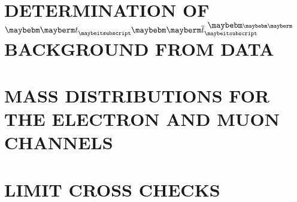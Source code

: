 \chapter{DETERMINATION OF $\ttbar$ BACKGROUND FROM DATA}
\label{sec:appttbar}




\chapter{MASS DISTRIBUTIONS FOR THE ELECTRON AND MUON CHANNELS}
\label{sec:emuratios}


\chapter{LIMIT CROSS CHECKS}
\label{sec:cutcount}


%

